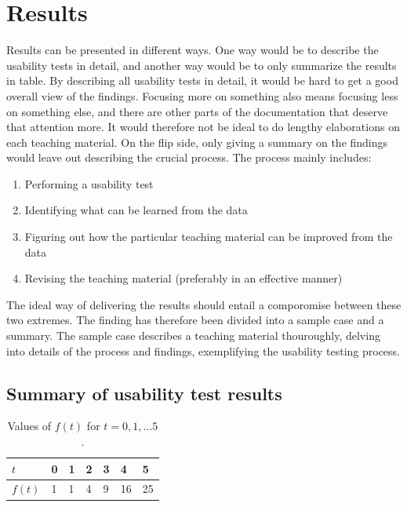 \chapter{Results}
Results can be presented in different ways. One way would be to describe the usability tests in detail, and another way would be to only summarize the results in table. 
By describing all usability tests in detail, it would be hard to get a good overall view of the findings. Focusing more on something also means focusing less on something 
else, and there are other parts of the documentation that deserve that attention more. It would therefore not be ideal to do lengthy elaborations on each teaching material.
On the flip side, only giving a summary on the findings would leave out describing the crucial process. The process mainly includes:
\begin{enumerate}
	\item Performing a usability test
	\item Identifying what can be learned from the data
	\item Figuring out how the particular teaching material can be improved from the data
	\item Revising the teaching material (preferably in an effective manner)
\end{enumerate}
The ideal way of delivering the results should entail a comporomise between these two extremes. The finding has therefore been divided into a sample case and a summary.
The sample case describes a teaching material thouroughly, delving into details of the process and findings, exemplifying the usability testing process. 


%

\section{Summary of usability test results}


\begin{table}[H]
\centering
\caption{Values of $f(t)$ for $t=0,1,\dots 5$.}
\begin{tabular}{l|llllll} \hline\hline
$t$ & 0 & 1 & 2 & 3 & 4 & 5 \\ \hline
$f(t)$ & 1 & 1 & 4 & 9 & 16 & 25 \\ \hline\hline
\end{tabular}
\end{table}

